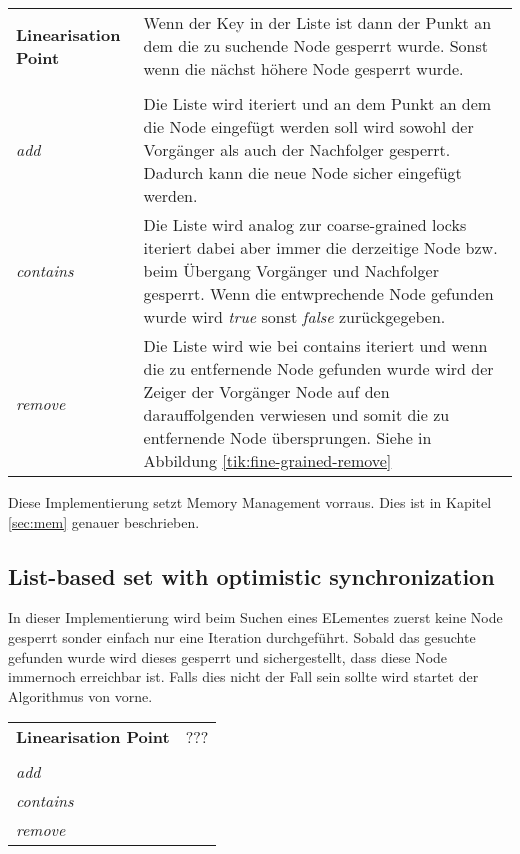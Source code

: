 \begin{table}[H]
    \begin{tabularx}{\textwidth}{lX}
        \textbf{Linearisation Point} & Wenn der Key in der Liste ist dann der Punkt an dem die zu suchende Node gesperrt wurde. Sonst wenn die nächst höhere Node gesperrt wurde.\\
        \\
        \textit{add} & Die Liste wird iteriert und an dem Punkt an dem die Node eingefügt werden soll wird sowohl der Vorgänger als auch der Nachfolger gesperrt. Dadurch kann die neue Node sicher eingefügt werden.\\
        \textit{contains} & Die Liste wird analog zur coarse-grained locks iteriert dabei aber immer die derzeitige Node bzw. beim Übergang Vorgänger und Nachfolger gesperrt. Wenn die entwprechende Node gefunden wurde wird \textit{true} sonst \textit{false} zurückgegeben. \\
        \textit{remove} & Die Liste wird wie bei contains iteriert und wenn die zu entfernende Node gefunden wurde wird der Zeiger der Vorgänger Node auf den darauffolgenden verwiesen und somit die zu entfernende Node übersprungen. Siehe in Abbildung \ref{tik:fine-grained-remove}\\
    \end{tabularx}
\end{table}

Diese Implementierung setzt Memory Management vorraus. Dies ist in Kapitel \ref{sec:mem} genauer beschrieben.

\subsection{List-based set with optimistic synchronization}

In dieser Implementierung wird beim Suchen eines ELementes zuerst keine Node gesperrt sonder einfach nur eine Iteration durchgeführt. Sobald das gesuchte gefunden wurde wird dieses gesperrt und sichergestellt, dass diese Node immernoch erreichbar ist. Falls dies nicht der Fall sein sollte wird startet der Algorithmus von vorne.

\begin{table}[H]
    \begin{tabularx}{\textwidth}{lX}
        \textbf{Linearisation Point} & ???\\
        \\
        \textit{add} & \\
        \textit{contains} & \\
        \textit{remove} & \\
    \end{tabularx}
\end{table}

